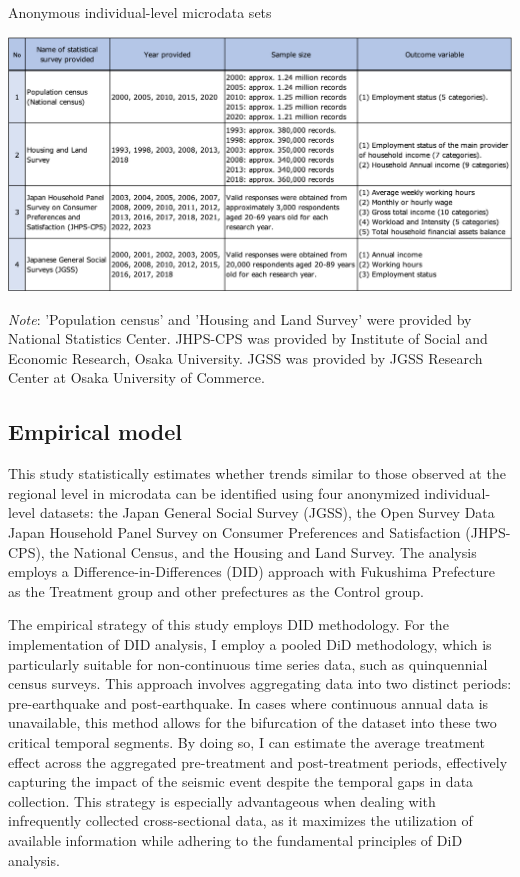 \documentclass[12pt,halfline,a4paper]{ouparticle}
\begin{document}
\begin{table}[h!]
    \centering
    \caption{Anonymous individual-level microdata sets}
    \label{tab:list}
    \includegraphics[width=1.0\textwidth]{list.png} 

    \begin{tablenotes}
        \item{\small{\textit{Note}: 'Population census' and 'Housing and Land Survey' were provided by National Statistics Center. JHPS-CPS was provided by Institute of Social and Economic Research, Osaka University. JGSS was provided by JGSS Research Center at Osaka University of Commerce.}}
    \end{tablenotes}
    
\end{table}

\newpage

\subsection{Empirical model}
\label{sec5.1}

This study statistically estimates whether trends similar to those observed at the regional level in microdata can be identified using four anonymized individual-level datasets: the Japan General Social Survey (JGSS), the Open Survey Data Japan Household Panel Survey on Consumer Preferences and Satisfaction (JHPS-CPS), the National Census, and the Housing and Land Survey. The analysis employs a Difference-in-Differences (DID) approach with Fukushima Prefecture as the Treatment group and other prefectures as the Control group.

The empirical strategy of this study employs DID methodology. For the implementation of DID analysis, I employ a pooled DiD methodology, which is particularly suitable for non-continuous time series data, such as quinquennial census surveys. This approach involves aggregating data into two distinct periods: pre-earthquake and post-earthquake. In cases where continuous annual data is unavailable, this method allows for the bifurcation of the dataset into these two critical temporal segments. By doing so, I can estimate the average treatment effect across the aggregated pre-treatment and post-treatment periods, effectively capturing the impact of the seismic event despite the temporal gaps in data collection. This strategy is especially advantageous when dealing with infrequently collected cross-sectional data, as it maximizes the utilization of available information while adhering to the fundamental principles of DiD analysis.
\end{document}
